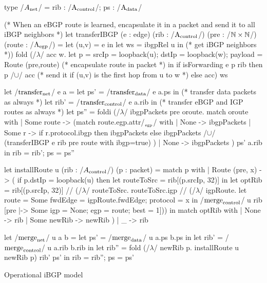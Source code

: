 \documentclass[sigconf,10pt]{acmart}
\begin{document}
\begin{listing}[ht]
  \begin{ocamlcode}
    type /$A_{\net}$/ = { rib : /$\A_{\control}$/; ps : /$\A_{\data}$/ }

    (* When an eBGP route is learned, encapsulate it in a packet and send it to all iBGP
       neighbors *)
    let transferIBGP (e : edge) (rib : /$\A_{\control}$/) (pre : /$\nat \times \nat$/) (route : /$\A_{\egp}$/) =
      let (u,v) = e in
      let ws = ibgpRel u in (* get iBGP neighbors *))
      fold (/$\lambda$/ acc w.
        let p = { srcIp = loopback(u);
                     dstIp = loopback(w);
                     payload = Route (pre,route) } (* encapsulate route in packet *)
        in
        if isForwarding e p rib then
          {p} /$\cup$/ acc (* send it if (u,v) is the first hop from u to w *)
        else
          acc) {} ws
      
    let /$\transfer_{\net}$/ e a =
      let ps' = /$\transfer_{\data}$/ e a.ps in (* transfer data packets as always *)
      let rib' = /$\transfer_{\control}$/ e a.rib in (* transfer eBGP and IGP routes as always *)
      let ps'' = foldi (/$\lambda$/ ibgpPackets pre oroute.
                        match oroute with
                        | Some route ->
                          (match route.egp.attr/$_{_\egp}$/ with
                           | None -> ibgpPackets
                           | Some r ->
                             if r.protocol.ibgp then
                               ibgpPackets
                             else
                               ibgpPackets /$\cup$/ (transferIBGP e rib pre {route with ibgp=true})
                           )
                        | None ->
                        ibgpPackets ) ps' a.rib
      in
      { rib = rib'; ps = ps''}
      
    let installRoute u (rib : /$A_{\control}$/) (p : packet) =
      match p with
      | Route (pre, x) -> (
        if p.dstIp = loopback(u) then
          let routeToSrc = rib[(p.srcIp, 32)] in
          let optRib =
            rib[(p.srcIp, 32)] /\bind/
              (/$\lambda$/ routeToSrc.
                routeToSrc.igp /\bind/
                  (/$\lambda$/ igpRoute. 
                    let route = Some { fwdEdge = igpRoute.fwdEdge; protocol = x  } in
                    /$\merge_{\control}$/ u rib [pre |-> Some {igp = None; egp = route; best = 1}]))
          in
          match optRib with
          | None -> rib
          | Some newRib -> newRib
        )
      | _ -> rib  
          
    let /$\merge_{\net}$/ u a b =
      let ps' = /$\merge_{\data}$/ u a.ps b.ps in
      let rib' = /$\merge_{\control}$/ u a.rib b.rib in
      let rib'' = fold (/$\lambda$/ newRib p. installRoute u newRib p) rib' ps' in
      { rib = rib''; ps = ps'}
\end{ocamlcode}
\caption{Operational iBGP model}
\label{lst:ibgp-model}
\end{listing}
\end{document}
